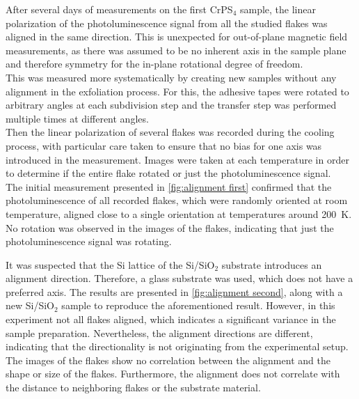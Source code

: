 \documentclass[
	twoside,
	parskip=half,
	a4paper,
]{scrbook}
\begin{document}
After several days of measurements on the first CrPS$_4$ sample, the linear polarization of the photoluminescence signal from all the studied flakes was aligned in the same direction.
This is unexpected for out-of-plane magnetic field measurements, as there was assumed to be no inherent axis in the sample plane and therefore symmetry for the in-plane rotational degree of freedom.\\
This was measured more systematically by creating new samples without any alignment in the exfoliation process.
For this, the adhesive tapes were rotated to arbitrary angles at each subdivision step and the transfer step was performed multiple times at different angles.\\
Then the linear polarization of several flakes was recorded during the cooling process, with particular care taken to ensure that no bias for one axis was introduced in the measurement.
Images were taken at each temperature in order to determine if the entire flake rotated or just the photoluminescence signal. \\
The initial measurement presented in \autoref{fig:alignment first} confirmed that the photoluminescence of all recorded flakes, which were randomly oriented at room temperature, aligned close to a single orientation at temperatures around \SI{200}{K}.
No rotation was observed in the images of the flakes, indicating that just the photoluminescence signal was rotating.

It was suspected that the Si lattice of the Si/SiO$_2$ substrate introduces an alignment direction.
Therefore, a glass substrate was used, which does not have a preferred axis.  
The results are presented in \autoref{fig:alignment second}, along with a new Si/SiO$_2$ sample to reproduce the aforementioned result.
However, in this experiment not all flakes aligned, which indicates a significant variance in the sample preparation.
Nevertheless, the alignment directions are different, indicating that the directionality is not originating from the experimental setup.
The images of the flakes show no correlation between the alignment and the shape or size of the flakes. 
Furthermore, the alignment does not correlate with the distance to neighboring flakes or the substrate material.
\end{document}
